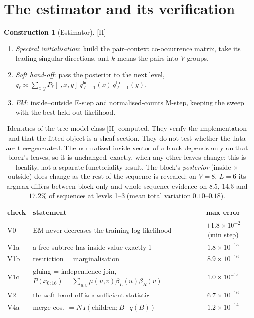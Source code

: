 \documentclass[11pt]{article}
\theoremstyle{definition}
\newtheorem{construction}[theorem]{Construction}
\theoremstyle{remark}
\newcommand{\src}[1]{\textsf{\small[#1]}}
\newcommand{\st}[1]{\textsf{\small\color{gray}#1}}
\begin{document}
\section{The estimator and its verification}
\begin{construction}[Estimator]\src{H}
\begin{enumerate}
  \item \emph{Spectral initialisation}: build the pair--context co-occurrence matrix, take its leading singular directions, and $k$-means the pairs into $V$ groups.
  \item \emph{Soft hand-off}: pass the posterior to the next level, $q_\ell\propto\sum_{x,y}P_\ell[\cdot,x,y]\,q^{\text{lo}}_{\ell-1}(x)\,q^{\text{hi}}_{\ell-1}(y)$.
  \item \emph{EM}: inside--outside E-step and normalised-counts M-step, keeping the sweep with the best held-out likelihood.
\end{enumerate}
\end{construction}

\begin{table}[!htbp]\centering\small
\begin{tabular}{llc}
\toprule
check & statement & max error\\
\midrule
V0 & EM never decreases the training log-likelihood & $+1.8\times10^{-2}$ (min step)\\
V1a & a free subtree has inside value exactly 1 & $1.8\times10^{-15}$\\
V1b & restriction = marginalisation & $8.9\times10^{-16}$\\
V1c & gluing = independence join, $P(x_{0:16})=\sum_{u,v}\mu(u,v)\beta_L(u)\beta_R(v)$ & $1.0\times10^{-14}$\\
V2 & the soft hand-off is a sufficient statistic & $6.7\times10^{-16}$\\
V4a & merge cost $=N\,I(\text{children};B\mid q(B))$ & $1.2\times10^{-14}$\\
\bottomrule
\end{tabular}
\caption{Identities of the tree model class \src{H} \st{computed}. They verify the implementation and that the fitted object is a sheaf section. They do not test whether the data are tree-generated. The normalised inside vector of a block depends only on that block's leaves, so it is unchanged, exactly, when any other leaves change; this is locality, not a separate functoriality result. The block's \emph{posterior} (inside $\times$ outside) does change as the rest of the sequence is revealed: on $V=8$, $L=6$ its argmax differs between block-only and whole-sequence evidence on $8.5$, $14.8$ and $17.2\%$ of sequences at levels 1--3 (mean total variation $0.10$--$0.18$).}
\label{tab:identities}
\end{table}
\end{document}
